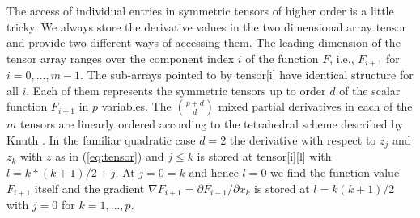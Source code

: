 \documentclass[11pt,twoside]{article}
\begin{document}
The access of individual entries in symmetric tensors of
higher order is a little tricky. We always store the derivative
values in the two dimensional array {\sf tensor} and provide two 
different ways of accessing them.  
The leading dimension of the tensor array ranges over 
the component index $i$ of the function $F$, i.e., $F_{i+1}$ for $i =
0,\ldots,m-1$. The sub-arrays pointed to by {\sf tensor[i]} have identical
structure for all $i$. Each of them represents the symmetric tensors up to
order $d$ of the scalar function $F_{i+1}$ in $p$ variables.  
%
The $\binom{p+d}{d}$ mixed partial derivatives in each of the $m$
tensors are linearly ordered according to the tetrahedral 
scheme described by Knuth \cite{Knuth73}. In the familiar quadratic 
case $d=2$ the derivative with respect to $z_j$ and $z_k$ with $z$ 
as in (\ref{eq:tensor}) and $j \leq k$ is stored at {\sf tensor[i][l]} with 
$l = k*(k+1)/2+j$. At $j = 0 = k$ and hence $l = 0$ we find the
function value $F_{i+1}$ itself and the gradient 
$\nabla F_{i+1}= \partial F_{i+1}/\partial x_k $ is stored at $l=k(k+1)/2$
with $j=0$ for $k=1,\ldots,p$.
\end{document}
